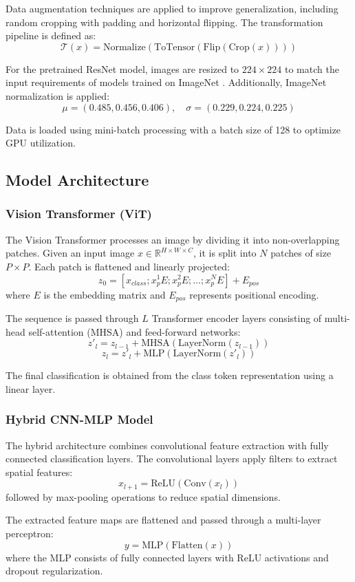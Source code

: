 \documentclass[conference]{IEEEtran}
\begin{document}
Data augmentation techniques are applied to improve generalization, including random cropping with padding and horizontal flipping. The transformation pipeline is defined as:
\[
\mathcal{T}(x) = \text{Normalize}(\text{ToTensor}(\text{Flip}(\text{Crop}(x))))
\]

For the pretrained ResNet model, images are resized to $224 \times 224$ to match the input requirements of models trained on ImageNet \cite{krizhevsky2012imagenet}. Additionally, ImageNet normalization is applied:
\[
\mu = (0.485, 0.456, 0.406), \quad \sigma = (0.229, 0.224, 0.225)
\]

Data is loaded using mini-batch processing with a batch size of 128 to optimize GPU utilization.

\subsection{Model Architecture}

\subsubsection{Vision Transformer (ViT)}
The Vision Transformer processes an image by dividing it into non-overlapping patches. Given an input image $x \in \mathbb{R}^{H \times W \times C}$, it is split into $N$ patches of size $P \times P$. Each patch is flattened and linearly projected:
\[
z_0 = [x_{class}; x_p^1E; x_p^2E; \dots; x_p^NE] + E_{pos}
\]
where $E$ is the embedding matrix and $E_{pos}$ represents positional encoding.

The sequence is passed through $L$ Transformer encoder layers consisting of multi-head self-attention (MHSA) and feed-forward networks:
\[
z'_l = z_{l-1} + \text{MHSA}(\text{LayerNorm}(z_{l-1}))
\]
\[
z_l = z'_l + \text{MLP}(\text{LayerNorm}(z'_l))
\]

The final classification is obtained from the class token representation using a linear layer.

\subsubsection{Hybrid CNN-MLP Model}
The hybrid architecture combines convolutional feature extraction with fully connected classification layers. The convolutional layers apply filters to extract spatial features:
\[
x_{l+1} = \text{ReLU}(\text{Conv}(x_l))
\]
followed by max-pooling operations to reduce spatial dimensions.

The extracted feature maps are flattened and passed through a multi-layer perceptron:
\[
y = \text{MLP}(\text{Flatten}(x))
\]
where the MLP consists of fully connected layers with ReLU activations and dropout regularization.
\end{document}
